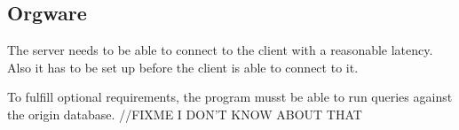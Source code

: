 \subsection{Orgware}

The server needs to be able to connect to the client with a reasonable latency.
Also it has to be set up before the client is able to connect to it.


To fulfill optional requirements, the program musst be able to run queries against
the origin database. //FIXME I DON'T KNOW ABOUT THAT

% 
